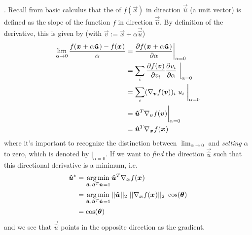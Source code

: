 \documentclass[11pt]{article}
\begin{document}
\myspace
{}. Recall from basic calculus that the  of $f(\vec x)$ in direction $\vec{\hat{u}}$ (a unit vector) is defined as the slope of the function $f$ in direction $\vec{\hat u}$. By definition of the derivative, this is given by (with $\vec v := \vec x + \alpha \vec{\hat u}$)
\begin{align}
	\lim_{\alpha \rightarrow 0} \frac{f(\bm{x}_{} + \alpha \bm{\hat u}_{}) - f(\bm{x}_{})   }{\alpha} &= \frac{\partial f(\bm{x}_{} + \alpha \bm{\hat u}_{})}{\partial \alpha} \bigg|_{\alpha=0} \\
	&= \sum_i \frac{\partial f(\bm{v}_{})}{\partial v_i}\frac{\partial v_i}{\partial \alpha} ~ \bigg|_{\alpha=0}  \\
	&= \sum_i (\nabla_{\bm{v}_{}} f(\bm{v}_{}))_i ~  u_i ~ \bigg|_{\alpha=0} \\
	&= \bm{\hat u}_{}^T \nabla_{\bm{v}_{}} f(\bm{v}_{}) \bigg|_{\alpha=0} \\
	&= \bm{\hat u}_{}^T \nabla_{\bm{x}_{}} f(\bm{x}_{}) \label{directional-deriv}
\end{align}
where it's important to recognize the distinction between $\lim_{\alpha \rightarrow 0}$ and \textit{setting} $\alpha$ to zero, which is denoted by $\big|_{\alpha=0}$. If we want to \textit{find} the direction $\vec{\hat u}$ such that this directional derivative is a minimum, i.e. 
\begin{align}
	\bm{\hat u}_{}^* &= \operatorname*{arg\,min}_{\bm{\hat u}_{}, \bm{\hat u}_{}^T \bm{\hat u}_{} = 1} \bm{\hat u}_{}^T \nabla_{\bm{x}_{}} f(\bm{x}_{}) \\
	&=  \operatorname*{arg\,min}_{\bm{\hat u}_{}, \bm{\hat u}_{}^T \bm{\hat u}_{} = 1} ||\bm{\hat u}_{}||_2 ~ ||\nabla_{\bm{x}_{}} f(\bm{x}_{})||_2 ~ \cos(\bm{\theta}_{}) \\
	&= \cos(\bm{\theta}_{})
\end{align}
and we see that $\vec{\hat u}$ points in the opposite direction as the gradient. 
\end{document}
